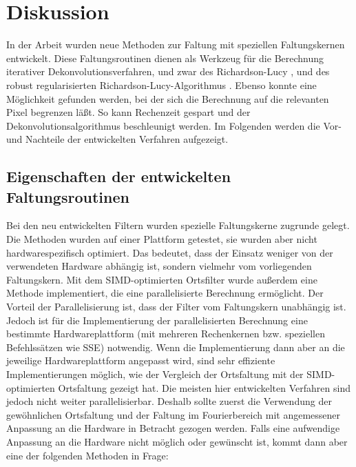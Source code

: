 \documentclass[a4paper,12pt]{article}
\begin{document}
\newpage

\section{Diskussion}

In der Arbeit wurden neue Methoden zur Faltung mit speziellen Faltungskernen
entwickelt. Diese Faltungsroutinen dienen als Werkzeug für die Berechnung
iterativer Dekonvolutions\-verfahren, und zwar des Richardson-Lucy
\cite{richardson}, \cite{lucy} und des robust regularisierten
Richardson-Lucy-Algorithmus \cite{rrrl}. Ebenso konnte eine Möglichkeit gefunden werden, bei der sich die Berechnung auf die relevanten Pixel begrenzen läßt. So
kann Rechenzeit gespart und der Dekonvolutionsalgorithmus beschleunigt werden.
Im Folgenden werden die Vor- und Nachteile der entwickelten Verfahren
aufgezeigt.

\subsection{Eigenschaften der entwickelten Faltungsroutinen}
Bei den neu entwickelten Filtern wurden spezielle Faltungskerne zugrunde gelegt.
Die Methoden wurden auf einer Plattform getestet, sie wurden aber
nicht hardware\-spezifisch optimiert. Das bedeutet, dass der Einsatz weniger von
der verwendeten Hardware abhängig ist, sondern vielmehr vom vorliegenden
Faltungskern. Mit dem SIMD-optimierten Ortsfilter wurde außerdem eine Methode
implementiert, die eine parallelisierte Berechnung ermöglicht. Der Vorteil
der Parallelisierung ist, dass der Filter vom Faltungskern unabhängig ist.
Jedoch ist für die Implementierung der parallelisierten Berechnung eine bestimmte 
Hardwareplattform (mit mehreren Rechenkernen bzw. speziellen Befehlssätzen wie
SSE) notwendig. Wenn die Implementierung dann aber an die jeweilige
Hardwareplattform angepasst wird, sind sehr effiziente Implementierungen
möglich, wie der Vergleich der Ortsfaltung mit der SIMD-optimierten Ortsfaltung
gezeigt hat. Die meisten hier entwickelten Verfahren sind jedoch nicht weiter
parallelisierbar. Deshalb sollte zuerst die Verwendung der gewöhnlichen
Ortsfaltung und der Faltung im Fourierbereich mit angemessener Anpassung an die
Hardware in Betracht gezogen werden. Falls eine aufwendige Anpassung an die
Hardware nicht möglich oder gewünscht ist, kommt dann aber eine der
folgenden Methoden in Frage:
\end{document}

